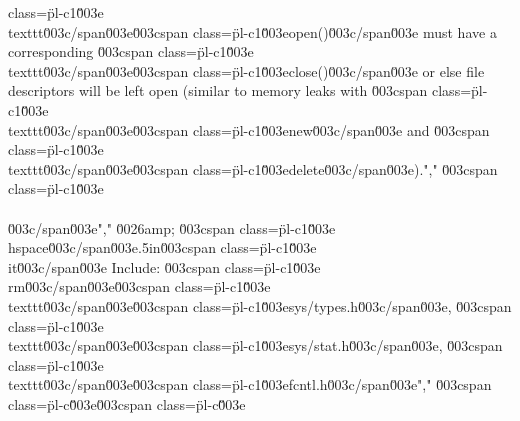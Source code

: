 class=\"pl-c1\"\u003e\\texttt\u003c/span\u003e{\u003cspan class=\"pl-c1\"\u003eopen()\u003c/span\u003e} must have a corresponding \u003cspan class=\"pl-c1\"\u003e\\texttt\u003c/span\u003e{\u003cspan class=\"pl-c1\"\u003eclose()\u003c/span\u003e} or else file descriptors will be left open (similar to memory leaks with \u003cspan class=\"pl-c1\"\u003e\\texttt\u003c/span\u003e{\u003cspan class=\"pl-c1\"\u003enew\u003c/span\u003e} and \u003cspan class=\"pl-c1\"\u003e\\texttt\u003c/span\u003e{\u003cspan class=\"pl-c1\"\u003edelete\u003c/span\u003e}).","        \u003cspan class=\"pl-c1\"\u003e\\\\\u003c/span\u003e","    \u0026amp; \u003cspan class=\"pl-c1\"\u003e\\hspace\u003c/span\u003e{.5in}\u003cspan class=\"pl-c1\"\u003e\\it\u003c/span\u003e Include: \u003cspan class=\"pl-c1\"\u003e\\rm\u003c/span\u003e\u003cspan class=\"pl-c1\"\u003e\\texttt\u003c/span\u003e{\u003cspan class=\"pl-c1\"\u003esys/types.h\u003c/span\u003e}, \u003cspan class=\"pl-c1\"\u003e\\texttt\u003c/span\u003e{\u003cspan class=\"pl-c1\"\u003esys/stat.h\u003c/span\u003e}, \u003cspan class=\"pl-c1\"\u003e\\texttt\u003c/span\u003e{\u003cspan class=\"pl-c1\"\u003efcntl.h\u003c/span\u003e}","        \u003cspan class=\"pl-c\"\u003e\u003cspan class=\"pl-c\"\u003e%